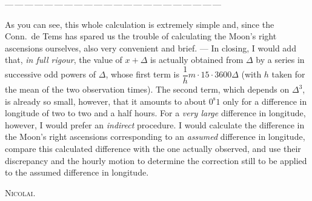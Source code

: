 \begin{center}
{\small ---\,---\,---\,---\,---\,---\,---\,---\,---\,---\,---\,---\,---\,---\,---\,---\,---\,---\,---\,---\,---\,---}
\end{center}

As you can see, this whole calculation is extremely simple and, since the Conn.\ de Tems has spared us the trouble of calculating the Moon's right ascensions ourselves, also very convenient and brief. --- In closing, I would add that, \emph{in full rigour}, the value of $x+\Delta$ is actually obtained from $\Delta$ by a series in successive odd powers of $\Delta$, whose first term is $\dfrac{1}{h}m\cdot15\cdot3600\Delta$ (with $h$ taken for the mean of the two observation times). The second term, which depends on $\Delta^3$, is already so small, however, that it amounts to about $0^{\mathrm{s}}1$ only for a difference in longitude of two to two and a half hours.
For a \emph{very large} difference in longitude, however, I would prefer an \emph{indirect} procedure. I would calculate the difference in the Moon's right ascensions corresponding to an \emph{assumed} difference in longitude, compare this calculated difference with the one actually observed, and use their discrepancy and the hourly motion to determine the correction still to be applied to the assumed difference in longitude.

\begin{flushright}
\textsc{Nicolai.}
\end{flushright}
